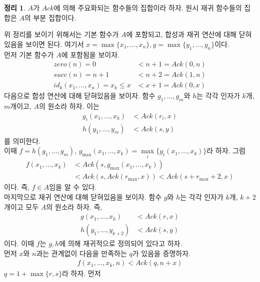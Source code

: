 \documentclass[b5paper, 11pt]{book}
\theoremstyle{definition}
\newtheorem{thm}[defn]{정리}
\newenvironment{pf*}{\pushQED{\qed}\pf}
{\popQED\endpf}
\begin{document}
\begin{thm} \label{forack}
    $A$가 $Ack$에 의해 주요화되는 함수들의 집합이라 하자. 원시 재귀 함수들의 집합은 $A$의 부분 집합이다.
\end{thm}
\begin{pf*}
    위 정리를 보이기 위해서는 기본 함수가 $A$에 포함되고, 합성과 재귀 연산에 대해 닫혀있음을 보이면 된다. 여기서 $x = \max \{x_1, \ldots, x_n\}, y = \max\{y_1, \ldots, y_n\}$이다. \\ 
    먼저 기본 함수가 $A$에 포함됨을 보이자.  
    \begin{align*}
        zero(n) = 0 &< n+1 = Ack(0,n) \\ 
        succ(n) = n+1 &<n+2 = Ack(1,n) \\ 
        id_k(x_1, \ldots, x_n) = x_k \le x &< x+1 = Ack(0,x) 
    \end{align*} 
    다음으로 합성 연산에 대해 닫혀있음을 보이자. 함수 $g_1, \ldots, g_m$와 $h$는 각각 인자가 $k$개, $m$개이고, $A$의 원소라 하자. 이는 
    \begin{align*}
        g_i(x_1, \ldots, x_k) &< Ack(r_i, x) \\ 
        h(y_1, \ldots, y_m) &< Ack(s,y)
    \end{align*}
    를 의미한다. \\ 
    이때 $f = h(g_1, \ldots, g_m)$, $ g_{\max} (x_1,\ldots, x_k) =\underset{i}{\max} \{g_i(x_1, \ldots, x_k)\}$라 하자. 
    그럼 
    \begin{align*}
        f(x_1, \ldots, x_k) &< Ack(s, g_{\max}(x_1, \ldots, x_k)) \\ 
        &< Ack(s, Ack(r_{\max},x)) < Ack(s+r_{\max}+2,x)
    \end{align*}
    이다. 즉, $f \in A$임을 알 수 있다. \\ 
    마지막으로 재귀 연산에 대해 닫혀있음을 보이자. 함수 $g$와 $h$는 각각 인자가 $k$개, $k+2$개이고 모두 $A$의 원소라 하자. 즉, 
    \begin{align*}
        g(x_1, \ldots, x_k) &< Ack(r, x) \\ 
        h(y_1,\ldots, y_{k+2}) &< Ack(s,y)
    \end{align*}
    이다. 이때 $f$는 $g,h$에 의해 재귀적으로 정의되어 있다고 하자.\\ 
    먼저 $x$와 $n$과는 관계없이 다음을 만족하는 $q$가 있음을 증명하자. 
    \begin{align*}
        f(x_1, \ldots, x_k, n) < Ack(q, n+x)
    \end{align*}
    $q= 1 + \max \{r,s\}$라 하자. 
    먼저 
    \begin{align*}

\end{align*}
\end{pf*}
\end{document}
